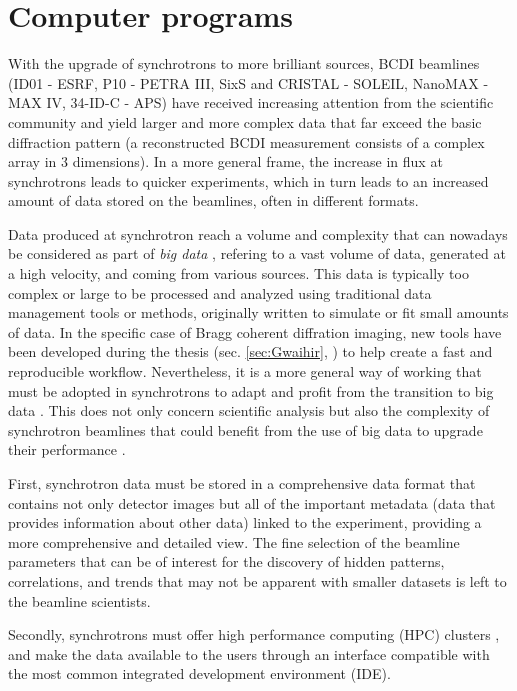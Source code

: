 \section{Computer programs}

With the upgrade of synchrotrons to more brilliant sources, BCDI beamlines (ID01 - ESRF, P10 - PETRA III, SixS and CRISTAL - SOLEIL, NanoMAX - MAX IV, 34-ID-C - APS) have received increasing attention from the scientific community and yield larger and more complex data that far exceed the basic diffraction pattern (a reconstructed BCDI measurement consists of a complex array in 3 dimensions).
In a more general frame, the increase in flux at synchrotrons leads to quicker experiments, which in turn leads to an increased amount of data stored on the beamlines, often in different formats.

Data produced at synchrotron reach a volume and complexity that can nowadays be considered as part of \textit{big data} \parencite{Alizada2017, Wang2018}, refering to a vast volume of data, generated at a high velocity, and coming from various sources.
This data is typically too complex or large to be processed and analyzed using traditional data management tools or methods, originally written to simulate or fit small amounts of data.
In the specific case of Bragg coherent diffration imaging, new tools have been developed during the thesis (sec. \ref{sec:Gwaihir}, \cite{jerome_carnis_2021_5741935, Simonne2022}) to help create a fast and reproducible workflow.
Nevertheless, it is a more general way of working that must be adopted in synchrotrons to adapt and profit from the transition to big data \parencite{Wang2018}.
This does not only concern scientific analysis but also the complexity of synchrotron beamlines that could benefit from the use of big data to upgrade their performance \parencite{Diadem}.

First, synchrotron data must be stored in a comprehensive data format \parencite{Konnecke2015} that contains not only detector images but all of the important metadata (data that provides information about other data) linked to the experiment, providing a more comprehensive and detailed view.
The fine selection of the beamline parameters that can be of interest for the discovery of hidden patterns, correlations, and trends that may not be apparent with smaller datasets is left to the beamline scientists.

Secondly, synchrotrons must offer high performance computing (HPC) clusters \parencite{Wang2021}, and make the data available to the users through an interface compatible with the most common integrated development environment (IDE).

